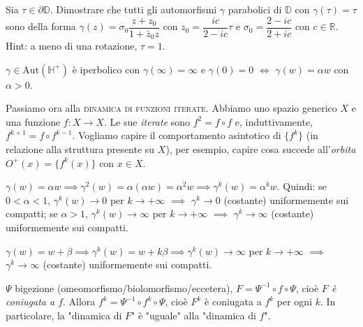\begin{exc}
  Sia $\tau \in \partial\mathbb{D}$. Dimostrare che tutti gli automorfismi $\gamma$ parabolici di $\mathbb{D}$ con $\gamma(\tau)=\tau$ sono della forma $\gamma(z)=\sigma_0\dfrac{z+z_0}{1+\bar{z}_0z}$ con $z_0=\dfrac{ic}{2-ic}\tau$ e $\sigma_0=\dfrac{2-ic}{2+ic}$ con $c \in \mathbb{R}$.
  Hint: a meno di una rotazione, $\tau=1$.
\end{exc}

\begin{ex}
  $\gamma \in \text{Aut}(\mathbb{H}^+)$ è iperbolico con $\gamma(\infty)=\infty$ e $\gamma(0)=0$ $\iff$ $\gamma(w)=\alpha w$ con $\alpha>0$.
\end{ex}

Passiamo ora alla \textsc{dinamica di funzioni iterate}. Abbiamo uno spazio generico $X$ e una funzione $f:X \longrightarrow X$. Le sue \textit{iterate} sono $f^2=f \circ f$ e, induttivamente, $f^{k+1}=f \circ f^{k-1}$. Vogliamo capire il comportamento asintotico di $\{f^k\}$ (in relazione alla struttura presente su $X$), per esempio, capire cosa succede all'\textit{orbita} $O^+(x)=\{f^k(x)\}$ con $x \in X$.

\begin{ex}
  $\gamma(w)=\alpha w \implies \gamma^2(w)=\alpha(\alpha w)=\alpha^2 w \implies \gamma^k(w)=\alpha^k w$.
  Quindi: se $0<\alpha<1$, $\gamma^k(w) \longrightarrow 0$ per $k \longrightarrow +\infty$ $\implies$ $\gamma^k \longrightarrow 0$ (costante) uniformemente sui compatti; se $\alpha>1$, $\gamma^k(w) \longrightarrow \infty$ per $k \longrightarrow +\infty$ $\implies$ $\gamma^k \longrightarrow \infty$ (costante) uniformemente sui compatti.
\end{ex}

\begin{ex}
  $\gamma(w)=w+\beta \implies \gamma^k(w)=w+k\beta \implies \gamma^k(w) \longrightarrow \infty$ per $k \longrightarrow +\infty$ $\implies$ $\gamma^k \longrightarrow \infty$ (costante) uniformemente sui compatti.
\end{ex}

\begin{oss}
  \begin{center}
  \end{center}
  $\Psi$ bigezione (omeomorfismo/biolomorfismo/eccetera), $F=\Psi^{-1} \circ f \circ \Psi$, cioè \textit{$F$ è coniugata a $f$}. Allora $f^k=\Psi^{-1} \circ f^k \circ \Psi$, cioè $F^k$ è coniugata a $f^k$ per ogni $k$. In particolare, la "dinamica di $F$" è "uguale" alla "dinamica di $f$".
\end{oss}

